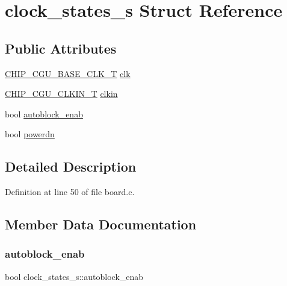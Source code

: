 \hypertarget{structclock__states__s}{}\section{clock\+\_\+states\+\_\+s Struct Reference}
\label{structclock__states__s}
\subsection*{Public Attributes}
\begin{DoxyCompactItemize}
\item 
\hyperlink{chip__clocks_8h_a31e266dd83cc66eb866d8d051ffd1d45}{C\+H\+I\+P\+\_\+\+C\+G\+U\+\_\+\+B\+A\+S\+E\+\_\+\+C\+L\+K\+\_\+T} \hyperlink{structclock__states__s_a7727daab54f625acad2297c9ec8eb0da}{clk}
\item 
\hyperlink{group___c_l_o_c_k__18_x_x__43_x_x_ga0975326707efebf2b074283e6c602f18}{C\+H\+I\+P\+\_\+\+C\+G\+U\+\_\+\+C\+L\+K\+I\+N\+\_\+T} \hyperlink{structclock__states__s_ae8fddb27bac6effab31d3370af6b9579}{clkin}
\item 
bool \hyperlink{structclock__states__s_a8642105cb7c5e4cc3a2b542a24ae8f60}{autoblock\+\_\+enab}
\item 
bool \hyperlink{structclock__states__s_a2030220aeab3bffa2b86c8b5d27773c3}{powerdn}
\end{DoxyCompactItemize}


\subsection{Detailed Description}


Definition at line 50 of file board.\+c.



\subsection{Member Data Documentation}
\mbox{\label{structclock__states__s_a8642105cb7c5e4cc3a2b542a24ae8f60}} 
\subsubsection{\texorpdfstring{autoblock\+\_\+enab}{autoblock\_enab}}
{\footnotesize\ttfamily bool clock\+\_\+states\+\_\+s\+::autoblock\+\_\+enab}



